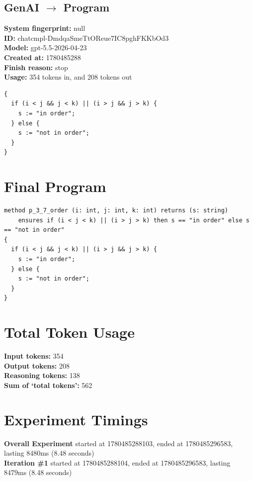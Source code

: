 \documentclass{article}
\begin{document}
\subsection*{GenAI $\rightarrow$ Program}
\textbf{System fingerprint: }null
\\\textbf{ID: }chatcmpl-DmdqaSmeTtOReue7IC8pghFKKbOd3
\\\textbf{Model: }gpt-5.5-2026-04-23
\\\textbf{Created at: }1780485288
\\\textbf{Finish reason: }stop
\\\textbf{Usage: }354 tokens in, and 208 tokens out
\begin{lstlisting}
{
  if (i < j && j < k) || (i > j && j > k) {
    s := "in order";
  } else {
    s := "not in order";
  }
}
\end{lstlisting}
\section*{Final Program}
\begin{lstlisting}
method p_3_7_order (i: int, j: int, k: int) returns (s: string)
	ensures if (i < j < k) || (i > j > k) then s == "in order" else s == "not in order"
{
  if (i < j && j < k) || (i > j && j > k) {
    s := "in order";
  } else {
    s := "not in order";
  }
}
\end{lstlisting}
\section*{Total Token Usage}
\textbf{Input tokens: }354
\\\textbf{Output tokens: }208
\\\textbf{Reasoning tokens: }138
\\\textbf{Sum of `total tokens': }562
\section*{Experiment Timings}
\textbf{Overall Experiment} started at 1780485288103, ended at 1780485296583, lasting 8480ms (8.48 seconds)
\\\textbf{Iteration \#1} started at 1780485288104, ended at 1780485296583, lasting 8479ms (8.48 seconds)
\end{document}
